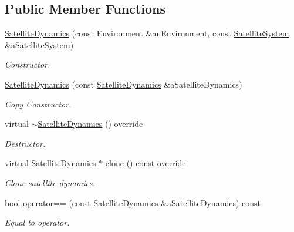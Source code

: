 \subsection*{Public Member Functions}
\begin{DoxyCompactItemize}
\item 
\hyperlink{classostk_1_1astro_1_1flight_1_1system_1_1dynamics_1_1_satellite_dynamics_a7bbf0ca2df46b4d1f9c2363010a2bd22}{Satellite\+Dynamics} (const Environment \&an\+Environment, const \hyperlink{classostk_1_1astro_1_1flight_1_1system_1_1_satellite_system}{Satellite\+System} \&a\+Satellite\+System)
\begin{DoxyCompactList}\small\item\em Constructor. \end{DoxyCompactList}\item 
\hyperlink{classostk_1_1astro_1_1flight_1_1system_1_1dynamics_1_1_satellite_dynamics_a8ced1fec7e36003eb50b8e15202fa571}{Satellite\+Dynamics} (const \hyperlink{classostk_1_1astro_1_1flight_1_1system_1_1dynamics_1_1_satellite_dynamics}{Satellite\+Dynamics} \&a\+Satellite\+Dynamics)
\begin{DoxyCompactList}\small\item\em Copy Constructor. \end{DoxyCompactList}\item 
virtual \hyperlink{classostk_1_1astro_1_1flight_1_1system_1_1dynamics_1_1_satellite_dynamics_a19f580468419341d3754707917aa835a}{$\sim$\+Satellite\+Dynamics} () override
\begin{DoxyCompactList}\small\item\em Destructor. \end{DoxyCompactList}\item 
virtual \hyperlink{classostk_1_1astro_1_1flight_1_1system_1_1dynamics_1_1_satellite_dynamics}{Satellite\+Dynamics} $\ast$ \hyperlink{classostk_1_1astro_1_1flight_1_1system_1_1dynamics_1_1_satellite_dynamics_a57d066e3876e999e288d00a23fb9ec9c}{clone} () const override
\begin{DoxyCompactList}\small\item\em Clone satellite dynamics. \end{DoxyCompactList}\item 
bool \hyperlink{classostk_1_1astro_1_1flight_1_1system_1_1dynamics_1_1_satellite_dynamics_a911f594991ee3b3a9187a34904118fc6}{operator==} (const \hyperlink{classostk_1_1astro_1_1flight_1_1system_1_1dynamics_1_1_satellite_dynamics}{Satellite\+Dynamics} \&a\+Satellite\+Dynamics) const
\begin{DoxyCompactList}\small\item\em Equal to operator. \end{DoxyCompactList}\item 

\end{DoxyCompactItemize}
